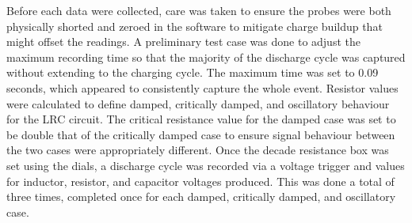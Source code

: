 Before each data were collected, care was taken to ensure the probes were both physically shorted and zeroed in the
software to mitigate charge buildup that might offset the readings.
A preliminary test case was done to adjust the maximum recording time so that the majority of the discharge cycle
was captured without extending to the charging cycle.
The maximum time was set to 0.09 seconds, which appeared to consistently capture the whole event.
Resistor values were calculated to define damped, critically damped, and oscillatory behaviour for the LRC circuit.
The critical resistance value for the damped case was set to be double that of the critically damped case to ensure
signal behaviour between the two cases were appropriately different.
Once the decade resistance box was set using the dials, a discharge cycle was recorded via a voltage trigger and values
for inductor,
resistor, and
capacitor voltages produced.
This was done a total of three times, completed once for each damped, critically damped, and oscillatory case.

